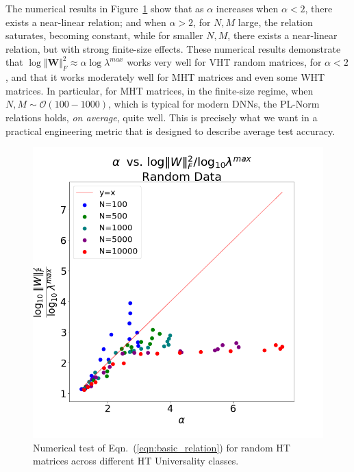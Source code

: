 {The numerical results in Figure~\ref{fig:randW} show that as $\alpha$ increases
when $\alpha<2$, there exists a near-linear relation; and
when $\alpha>2$, for $N,M$ large, the relation saturates, becoming constant, while for smaller $N,M$, there exists a near-linear relation, but with strong finite-size effects.
These numerical results demonstrate that $ \log\Vert\mathbf{W}\Vert^{2}_{F}\approx\alpha\log\lambda^{max} $ works very well for VHT random matrices, for $\alpha<2$, and that it works moderately well for MHT matrices and even some WHT matrices.
In particular, for MHT matrices, in the finite-size regime, when $N,M\sim\mathcal{O}(100-1000)$, which is typical for modern DNNs, the PL-Norm relations holds, \emph{on average}, quite well. 
This is precisely what we want in a practical engineering metric that is designed to describe average test accuracy. 

\begin{figure}[!htb]
   \centering
   \includegraphics[scale=0.25]{img/Alpha-LogNorm-Relations.png}
   \caption{
            Numerical test of Eqn.~(\ref{eqn:basic_relation}) for random HT matrices across different HT Universality classes.
           }
   \label{fig:randW}
\end{figure}



}
